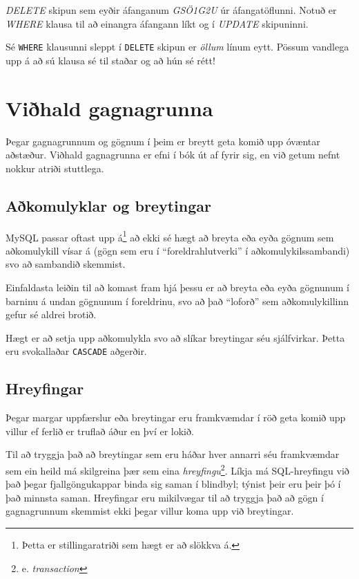 \begin{example}
\caption[DELETE]{\emph{DELETE} skipun sem eyðir áfanganum \emph{GSÖ1G2U} úr áfangatöflunni. Notuð er \emph{WHERE} klausa til að einangra áfangann líkt og í \emph{UPDATE} skipuninni.}
\label{sql:k7d4-delete}
\centering
{}
\end{example}

Sé \verb|WHERE| klausunni sleppt í \verb|DELETE| skipun er \emph{öllum} línum eytt. Pössum vandlega upp á að sú klausa sé til staðar og að hún sé rétt!
\section{Viðhald gagnagrunna}
Þegar gagnagrunnum og gögnum í þeim er breytt geta komið upp óvæntar aðstæður. Viðhald gagnagrunna er efni í bók út af fyrir sig, en við getum nefnt nokkur atriði stuttlega.
\subsection{Aðkomulyklar og breytingar}
MySQL passar oftast upp á\footnote{Þetta er stillingaratriði sem hægt er að slökkva á.} að ekki sé hægt að breyta eða eyða gögnum sem aðkomulykill vísar á (gögn sem eru í ``foreldrahlutverki'' í aðkomulykilssambandi) svo að sambandið skemmist.

Einfaldasta leiðin til að komast fram hjá þessu er að breyta eða eyða gögnunum í barninu á undan gögnunum í foreldrinu, svo að það ``loforð'' sem aðkomulykillinn gefur sé aldrei brotið.

Hægt er að setja upp aðkomulykla svo að slíkar breytingar séu sjálfvirkar. Þetta eru svokallaðar \verb|CASCADE| aðgerðir.
\subsection{Hreyfingar} %
Þegar margar uppfærslur eða breytingar eru framkvæmdar í röð geta komið upp villur ef ferlið er truflað áður en því er lokið.

Til að tryggja það að breytingar sem eru háðar hver annarri séu framkvæmdar sem ein heild má skilgreina þær sem eina \emph{hreyfingu}\footnote{e. \emph{transaction}}. Líkja má SQL-hreyfingu við það þegar fjallgöngukappar binda sig saman í blindbyl; týnist þeir eru þeir þó í það minnsta saman. Hreyfingar eru mikilvægar til að tryggja það að gögn í gagnagrunnum skemmist ekki þegar villur koma upp við breytingar.

